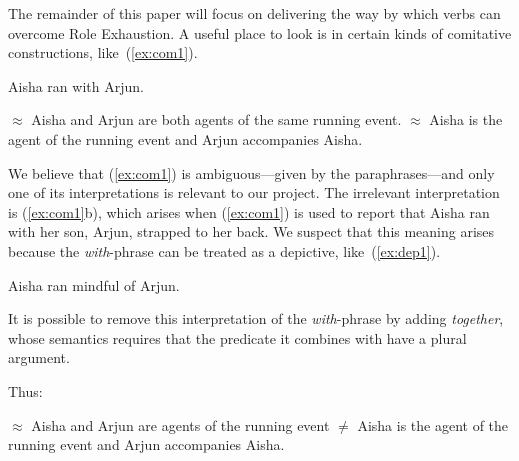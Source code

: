 \documentclass[twoside, 12pt]{article}
\begin{document}
The remainder of this paper will focus on delivering the way by which verbs can overcome Role Exhaustion. A useful place to look is in certain kinds of comitative constructions, like~(\ref{ex:com1}).
\begin{exe}
\raggedright
  \ex \label{ex:com1} Aisha ran with Arjun.
  \begin{xlist}
    \ex $\approx$ Aisha and Arjun are both agents of the same running event.
    \ex $\approx$ Aisha is the agent of the running event and Arjun accompanies Aisha.
  \end{xlist}
\end{exe}
We believe that (\ref{ex:com1}) is ambiguous---given by the paraphrases---and only one of its interpretations is relevant to our project. The irrelevant interpretation is (\ref{ex:com1}b), which arises when (\ref{ex:com1}) is used to report that Aisha ran with her son, Arjun, strapped to her back. We suspect that this meaning arises because the \textit{with}-phrase can be treated as a depictive, like~(\ref{ex:dep1}).
\begin{exe}
\raggedright
  \ex \label{ex:dep1}
  Aisha ran mindful of Arjun.
\end{exe}
It is possible to remove this interpretation of the \textit{with}-phrase by adding \textit{together}, whose semantics requires that the predicate it combines with have a plural argument. 
\begin{exe}
\raggedright
  \ex \label{ex:togetherbase}
  \begin{xlist}
  \end{xlist}
\end{exe}
Thus:
\begin{exe}
\raggedright
  \ex \label{ex:together1}
  \begin{xlist}
    \begin{xlist}
      \ex $\approx$ Aisha and Arjun are agents of the running event
      \ex $\neq$ Aisha is the agent of the running event and Arjun accompanies Aisha.
    \end{xlist}
  \end{xlist}
\end{exe}
\end{document}
